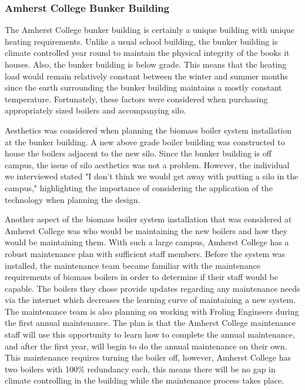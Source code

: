 \subsubsection{Amherst College Bunker Building}
\par The Amherst College bunker building is certainly a unique building with unique heating requirements. Unlike a usual school building, the bunker building is climate controlled year round to maintain the physical integrity of the books it houses. Also, the bunker building is below grade. This means that the heating load would remain relatively constant between the winter and summer months since the earth surrounding the bunker building maintains a mostly constant temperature. Fortunately, these factors were considered when purchasing appropriately sized boilers and accompanying silo.
\par Aesthetics was considered when planning the biomass boiler system installation at the bunker building. A new above grade boiler building was constructed to house the boilers adjacent to the new silo. Since the bunker building is off campus, the issue of silo aesthetics was not a problem. However, the individual we interviewed stated "I don’t think we would get away with putting a silo in the campus," highlighting the importance of considering the application of the technology when planning the design.
\par Another aspect of the biomass boiler system installation that was considered at Amherst College was who would be maintaining the new boilers and how they would be maintaining them. With such a large campus, Amherst College has a robust maintenance plan with sufficient staff members. Before the system was installed, the maintenance team became familiar with the maintenance requirements of biomass boilers in order to determine if their staff would be capable. The boilers they chose provide updates regarding any maintenance needs via the internet which decreases the learning curve of maintaining a new system. The maintenance team is also planning on working with Froling Engineers during the first annual maintenance. The plan is that the Amherst College maintenance staff will use this opportunity to learn how to complete the annual maintenance, and after the first year, will begin to do the annual maintenance on their own. This maintenance requires turning the boiler off, however, Amherst College has two boilers with 100\% redundancy each, this means there will be no gap in climate controlling in the building while the maintenance process takes place.

